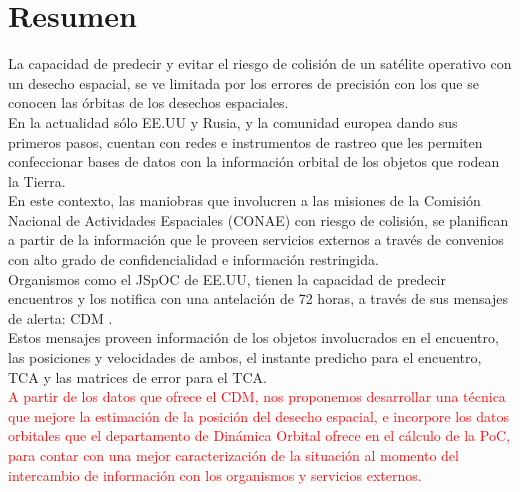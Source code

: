 \chapter*{Resumen}
\label{chap:resumen}




La capacidad de predecir y evitar el riesgo de colisión de un sat\'elite operativo con un desecho espacial, se ve limitada por los errores de precisi\'on con los que se conocen las \'orbitas de los desechos espaciales.\\

En la actualidad s\'olo EE.UU y Rusia, y la comunidad europea dando sus primeros pasos, cuentan con redes e instrumentos de rastreo que les permiten confeccionar bases de datos con la informaci\'on orbital de los objetos que rodean la Tierra.\\

En este contexto, las maniobras que involucren a las misiones de la Comisi\'on Nacional de Actividades Espaciales (CONAE) con riesgo de colisi\'on, se planifican a partir de la informaci\'on que le proveen servicios externos a trav\'es de convenios con alto grado de confidencialidad e informaci\'on restringida.\\ 

Organismos como el \ac{JSpOC} de EE.UU, tienen la capacidad de predecir encuentros y los notifica con una antelaci\'on de 72 horas, a trav\'es de sus mensajes de alerta: \ac{CDM} \cite{CDM}.\\
Estos mensajes proveen informaci\'on de los objetos involucrados en el encuentro, las posiciones y velocidades de ambos, el instante predicho para el encuentro, \ac{TCA} y las matrices de error para el TCA.\\

\textcolor{red}{A partir de los datos que ofrece el \ac{CDM}, nos proponemos desarrollar una t\'ecnica que mejore la estimaci\'on de la posici\'on del desecho espacial, e incorpore los datos orbitales que el departamento de Din\'amica Orbital ofrece en el c\'alculo de la \ac{PoC}, para contar con una mejor caracterizaci\'on de la situaci\'on al momento del intercambio de informaci\'on con los organismos y servicios externos.}\\
